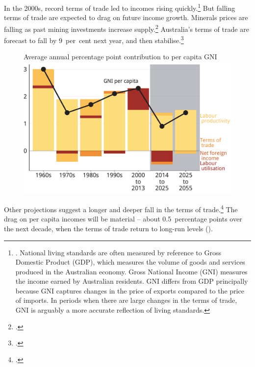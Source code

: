 \documentclass[twoside,english]{palatinob5portrait}
\begin{document}
In the 2000s, record terms of trade led to incomes rising quickly.\footnote{\textcite{Carmody2013}. National living standards are often measured by reference to Gross Domestic Product (GDP), which measures the volume of goods and services produced in the Australian economy. Gross National Income (GNI) measures the income earned by Australian residents. GNI differs from GDP principally because GNI captures changes in the price of exports compared to the price of imports. In periods when there are large changes in the terms of trade, GNI is arguably a more accurate reflection of living standards.}  But falling terms of trade are expected to drag on future income growth. Minerals prices are falling as past mining investments increase supply.\footcites{Stevens2013}{MinifieCherastidthamMullerworthEtAl2013}  Australia’s terms of trade are forecast to fall by 9~per~cent next year, and then stabilise.\footcite[][2--5]{Treasury2015BudgetPapers201516}   

\begin{figure}[!t]
%
{Average annual percentage point contribution to per capita GNI}
\includegraphics[width=\columnwidth]{b5-figure/FISCAL-Figure5-1.pdf}

\end{figure} 

Other projections suggest a longer and deeper fall in the terms of trade.\footcite{Treasury2014-Budget-Papers-2014-15}  The drag on per capita incomes will be material – about 0.5~percentage points over the next decade, when the terms of trade return to long-run levels ().
\end{document}
